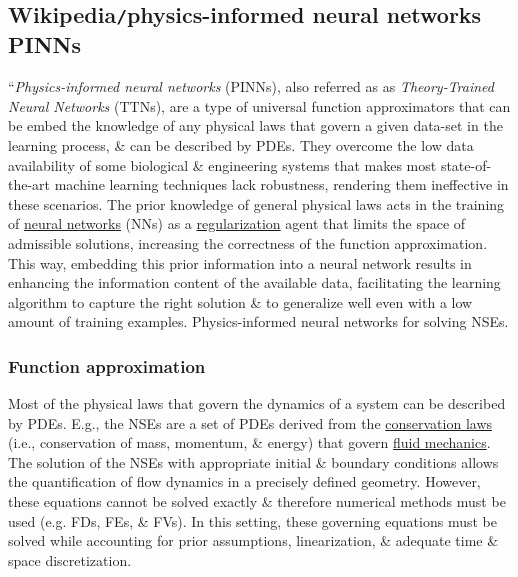 \documentclass{article}
\begin{document}
\subsection{Wikipedia{\tt/}physics-informed neural networks PINNs}
``{\it Physics-informed neural networks} (PINNs), also referred as as {\it Theory-Trained Neural Networks} (TTNs), are a type of universal function approximators that can be embed the knowledge of any physical laws that govern a given data-set in the learning process, \& can be described by PDEs. They overcome the low data availability of some biological \& engineering systems that makes most state-of-the-art machine learning techniques lack robustness, rendering them ineffective in these scenarios. The prior knowledge of general physical laws acts in the training of \href{https://en.wikipedia.org/wiki/Neural_network}{neural networks} (NNs) as a \href{https://en.wikipedia.org/wiki/Regularization_(mathematics)}{regularization} agent that limits the space of admissible solutions, increasing the correctness of the function approximation. This way, embedding this prior information into a neural network results in enhancing the information content of the available data, facilitating the learning algorithm to capture the right solution \& to generalize well even with a low amount of training examples. {\sf Physics-informed neural networks for solving NSEs.}

\subsubsection{Function approximation}
Most of the physical laws that govern the dynamics of a system can be described by PDEs. E.g., the NSEs are a set of PDEs derived from the \href{https://en.wikipedia.org/wiki/Conservation_law}{conservation laws} (i.e., conservation of mass, momentum, \& energy) that govern \href{https://en.wikipedia.org/wiki/Fluid_mechanics}{fluid mechanics}. The solution of the NSEs with appropriate initial \& boundary conditions allows the quantification of flow dynamics in a precisely defined geometry. However, these equations cannot be solved exactly \& therefore numerical methods must be used (e.g. FDs, FEs, \& FVs). In this setting, these governing equations must be solved while accounting for prior assumptions, linearization, \& adequate time \& space discretization.
\end{document}
